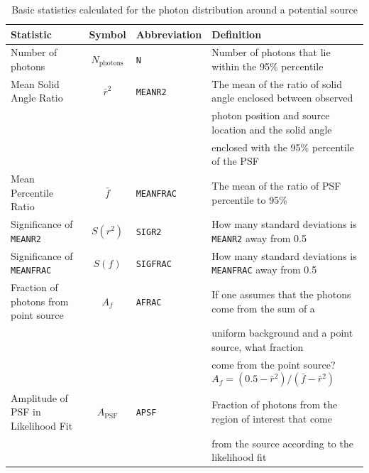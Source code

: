 \documentclass[useAMS,usenatbib]{mn2e}
\begin{document}
\begin{table}
  \caption{Basic statistics calculated for the photon distribution around a potential source}
  \label{tab:stats}
  \begin{tabular}{l|cll}
    \hline
    Statistic & Symbol & Abbreviation & Definition \\
    \hline
    Number of photons                     &  $N_\mathrm{photons}$ & \texttt{N}        & Number of photons that lie within the 95\% percentile \\
    Mean Solid Angle Ratio                &  $\bar r^2$          & \texttt{MEANR2}   & The mean of the ratio of solid angle enclosed between observed \\
                                          &                      &                   & photon position and source location and the solid angle \\
                                          &                      &                   & enclosed with the 95\% percentile of the PSF \\
    Mean Percentile Ratio                 &  $\bar f$            & \texttt{MEANFRAC} & The mean of the ratio of PSF percentile to 95\% \\
    Significance of \texttt{MEANR2}       & $S(r^2)$             & \texttt{SIGR2}    & How many standard deviations is \texttt{MEANR2} away from 0.5 \\
    Significance of \texttt{MEANFRAC}     & $S(f)$               & \texttt{SIGFRAC}  & How many standard deviations is \texttt{MEANFRAC} away from 0.5 \\
    Fraction of photons from point source & $A_f$                & \texttt{AFRAC}    & If one assumes that the photons come from the sum of a  \\
                                          &                      &                   & uniform background and a point source, what fraction \\
                                          &                      &                   & come from the point source? $A_f=(0.5-\bar r^2)/(\bar f-\bar r^2)$ \\
    Amplitude of PSF in Likelihood Fit      & $A_\mathrm{PSF}$      & \texttt{APSF}     & Fraction of photons from the region of interest that come \\
                                          &                      &                   & from the source according to the likelihood fit \\
  \end{tabular}
\end{table}
\end{document}
